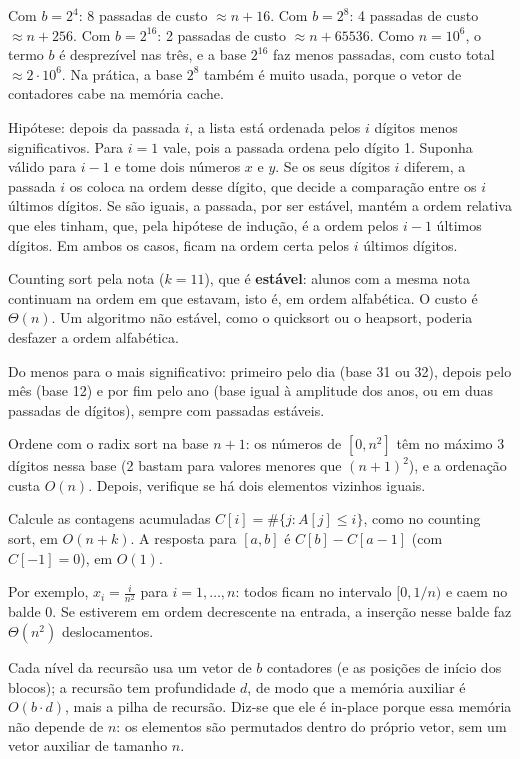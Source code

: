  Com $b=2^4$: 8 passadas de custo $\approx n+16$. Com $b=2^8$: 4 passadas de custo $\approx n+256$. Com $b=2^{16}$: 2 passadas de custo $\approx n+65536$. Como $n=10^6$, o termo $b$ é desprezível nas três, e a base $2^{16}$ faz menos passadas, com custo total $\approx2\cdot10^6$. Na prática, a base $2^8$ também é muito usada, porque o vetor de contadores cabe na memória cache.

 Hipótese: depois da passada $i$, a lista está ordenada pelos $i$ dígitos menos significativos. Para $i=1$ vale, pois a passada ordena pelo dígito 1. Suponha válido para $i-1$ e tome dois números $x$ e $y$. Se os seus dígitos $i$ diferem, a passada $i$ os coloca na ordem desse dígito, que decide a comparação entre os $i$ últimos dígitos. Se são iguais, a passada, por ser estável, mantém a ordem relativa que eles tinham, que, pela hipótese de indução, é a ordem pelos $i-1$ últimos dígitos. Em ambos os casos, ficam na ordem certa pelos $i$ últimos dígitos.

 Counting sort pela nota ($k=11$), que é \textbf{estável}: alunos com a mesma nota continuam na ordem em que estavam, isto é, em ordem alfabética. O custo é $\Theta(n)$. Um algoritmo não estável, como o quicksort ou o heapsort, poderia desfazer a ordem alfabética.

 Do menos para o mais significativo: primeiro pelo dia (base 31 ou 32), depois pelo mês (base 12) e por fim pelo ano (base igual à amplitude dos anos, ou em duas passadas de dígitos), sempre com passadas estáveis.

 Ordene com o radix sort na base $n+1$: os números de $[0,n^2]$ têm no máximo 3 dígitos nessa base (2 bastam para valores menores que $(n+1)^2$), e a ordenação custa $O(n)$. Depois, verifique se há dois elementos vizinhos iguais.

 Calcule as contagens acumuladas $C[i]=\#\{j:A[j]\le i\}$, como no counting sort, em $O(n+k)$. A resposta para $[a,b]$ é $C[b]-C[a-1]$ (com $C[-1]=0$), em $O(1)$.

 Por exemplo, $x_i=\frac{i}{n^2}$ para $i=1,\dots,n$: todos ficam no intervalo $[0,1/n)$ e caem no balde 0. Se estiverem em ordem decrescente na entrada, a inserção nesse balde faz $\Theta(n^2)$ deslocamentos.

 Cada nível da recursão usa um vetor de $b$ contadores (e as posições de início dos blocos); a recursão tem profundidade $d$, de modo que a memória auxiliar é $O(b\cdot d)$, mais a pilha de recursão. Diz-se que ele é in-place porque essa memória não depende de $n$: os elementos são permutados dentro do próprio vetor, sem um vetor auxiliar de tamanho $n$.
